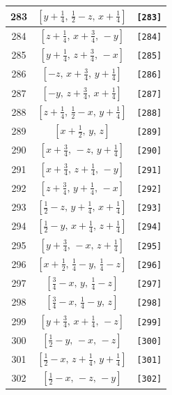 \documentclass[fleqn,8pt]{jsarticle}
\begin{document}
\begin{longtable}{ccc}
283 & $\left[ y + \frac{1}{4},\, \frac{1}{2} - z,\, x + \frac{1}{4} \right]$ & {\tt [283]} \\ \hline
284 & $\left[ z + \frac{1}{4},\, x + \frac{3}{4},\, - y \right]$ & {\tt [284]} \\ \hline
285 & $\left[ y + \frac{1}{4},\, z + \frac{3}{4},\, - x \right]$ & {\tt [285]} \\ \hline
286 & $\left[ - z,\, x + \frac{3}{4},\, y + \frac{1}{4} \right]$ & {\tt [286]} \\ \hline
287 & $\left[ - y,\, z + \frac{3}{4},\, x + \frac{1}{4} \right]$ & {\tt [287]} \\ \hline
288 & $\left[ z + \frac{1}{4},\, \frac{1}{2} - x,\, y + \frac{1}{4} \right]$ & {\tt [288]} \\ \hline
289 & $\left[ x + \frac{1}{2},\, y,\, z \right]$ & {\tt [289]} \\ \hline
290 & $\left[ x + \frac{3}{4},\, - z,\, y + \frac{1}{4} \right]$ & {\tt [290]} \\ \hline
291 & $\left[ x + \frac{3}{4},\, z + \frac{1}{4},\, - y \right]$ & {\tt [291]} \\ \hline
292 & $\left[ z + \frac{3}{4},\, y + \frac{1}{4},\, - x \right]$ & {\tt [292]} \\ \hline
293 & $\left[ \frac{1}{2} - z,\, y + \frac{1}{4},\, x + \frac{1}{4} \right]$ & {\tt [293]} \\ \hline
294 & $\left[ \frac{1}{2} - y,\, x + \frac{1}{4},\, z + \frac{1}{4} \right]$ & {\tt [294]} \\ \hline
295 & $\left[ y + \frac{3}{4},\, - x,\, z + \frac{1}{4} \right]$ & {\tt [295]} \\ \hline
296 & $\left[ x + \frac{1}{2},\, \frac{1}{4} - y,\, \frac{1}{4} - z \right]$ & {\tt [296]} \\ \hline
297 & $\left[ \frac{3}{4} - x,\, y,\, \frac{1}{4} - z \right]$ & {\tt [297]} \\ \hline
298 & $\left[ \frac{3}{4} - x,\, \frac{1}{4} - y,\, z \right]$ & {\tt [298]} \\ \hline
299 & $\left[ y + \frac{3}{4},\, x + \frac{1}{4},\, - z \right]$ & {\tt [299]} \\ \hline
300 & $\left[ \frac{1}{2} - y,\, - x,\, - z \right]$ & {\tt [300]} \\ \hline
301 & $\left[ \frac{1}{2} - x,\, z + \frac{1}{4},\, y + \frac{1}{4} \right]$ & {\tt [301]} \\ \hline
302 & $\left[ \frac{1}{2} - x,\, - z,\, - y \right]$ & {\tt [302]} \\ \hline

\end{longtable}
\end{document}
